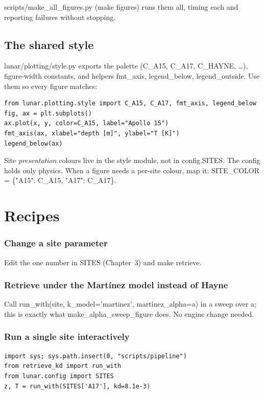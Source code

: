 \documentclass[11pt]{report}
\newcommand{\code}[1]{{\ttfamily\small #1}}
\newcommand{\file}[1]{\textcolor{forest}{\ttfamily #1}}
\begin{document}
\code{scripts/make\_all\_figures.py} (\code{make figures}) runs them all,
timing each and reporting failures without stopping.

\section{The shared style}

\file{lunar/plotting/style.py} exports the palette
(\code{C\_A15}, \code{C\_A17}, \code{C\_HAYNE}, \dots), figure-width
constants, and helpers \code{fmt\_axis}, \code{legend\_below},
\code{legend\_outside}. Use them so every figure matches:

\begin{lstlisting}[style=py]
from lunar.plotting.style import C_A15, C_A17, fmt_axis, legend_below
fig, ax = plt.subplots()
ax.plot(x, y, color=C_A15, label="Apollo 15")
fmt_axis(ax, xlabel="depth [m]", ylabel="T [K]")
legend_below(ax)
\end{lstlisting}

\begin{gotcha}
Site \emph{presentation} colours live in the style module, not in
\code{config.SITES}. The config holds only physics. When a figure needs a
per-site colour, map it: \code{SITE\_COLOR = \{"A15": C\_A15, "A17":
C\_A17\}}.
\end{gotcha}

\chapter{Recipes}

\subsection*{Change a site parameter}
Edit the one number in \code{SITES} (Chapter~3) and \code{make retrieve}.

\subsection*{Retrieve under the Mart\'inez model instead of Hayne}
Call \code{run\_with(site, k\_model='martinez', martinez\_alpha=a)} in a
sweep over \code{a}; this is exactly what \code{make\_alpha\_sweep\_figure}
does. No engine change needed.

\subsection*{Run a single site interactively}
\begin{lstlisting}[style=py]
import sys; sys.path.insert(0, "scripts/pipeline")
from retrieve_kd import run_with
from lunar.config import SITES
z, T = run_with(SITES['A17'], kd=8.1e-3)
\end{lstlisting}
\end{document}

